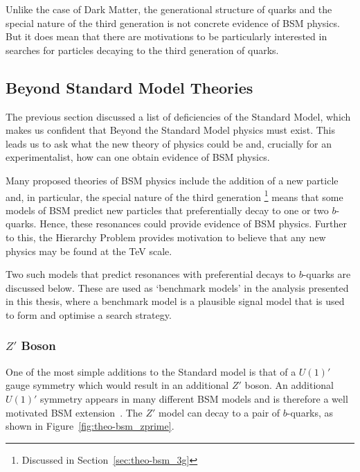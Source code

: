 Unlike the case of Dark Matter,
the generational structure of quarks
and the special nature of the third generation is not concrete evidence
of BSM physics.
But it does mean that there are motivations to be particularly interested in
searches for particles decaying to the third generation of quarks.

\subsection{Beyond Standard Model Theories}

The previous section discussed a list of deficiencies of the Standard Model,
which makes us confident that Beyond the Standard Model physics must exist.
This leads us to ask what the new theory of physics could be
and, crucially for an experimentalist,
how can one obtain evidence of BSM physics.

Many proposed theories of BSM physics include the addition of a new particle and,
in particular, the special nature of the third generation
\footnote{Discussed in Section~\ref{sec:theo-bsm_3g}}
means that some models of BSM predict new particles
that preferentially decay to one or two $b$-quarks.
Hence, these resonances could provide evidence of BSM physics.
Further to this, the Hierarchy Problem provides motivation to believe
that any new physics may be found at the TeV scale.

Two such models that predict resonances with preferential decays to $b$-quarks
are discussed below.
These are used as `benchmark models' in the analysis presented in this thesis,
where a benchmark model is a plausible signal model 
that is used to form and optimise a search strategy.

\subsubsection{$Z'$ Boson}

One of the most simple additions to the Standard model is that of a $U(1)'$ gauge symmetry
which would result in an additional $Z'$ boson.
An additional $U(1)'$ symmetry appears in many different BSM models and is therefore a well motivated BSM extension~\cite{theo-bsm_zprime}.
The $Z'$ model can decay to a pair of $b$-quarks, as shown in Figure~\ref{fig:theo-bsm_zprime}.

